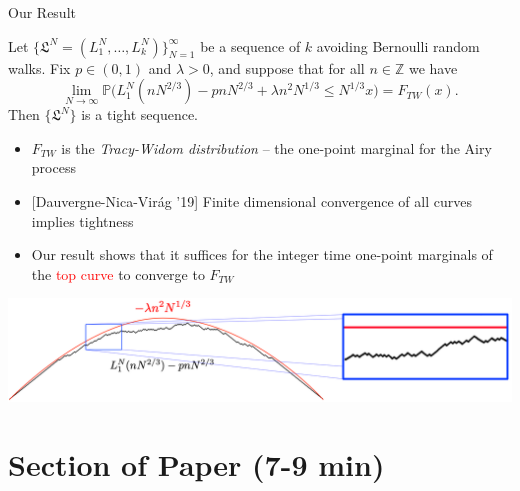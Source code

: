 \documentclass[9pt,t,dvipsnames]{beamer}
\begin{document}
\begin{frame}{Our Result}
\small{\begin{theorem}[DFFSTWZ] Let $\{\mathfrak{L}^N = (L_1^N,\dots,L_k^N)\}_{N=1}^\infty$ be a sequence of $k$ avoiding Bernoulli random walks. Fix $p\in(0,1)$ and $\lambda > 0$, and suppose that for all $n\in\mathbb{Z}$ we have
\[
\lim_{N\to\infty} \mathbb{P}\big(L_1^{N}(nN^{2/3}) - pnN^{2/3} + \lambda n^2 N^{1/3} \leq N^{1/3} x \big) = F_{TW}(x).
\]
Then $\{\mathfrak{L}^N\}$ is a tight sequence.
\end{theorem}}

\begin{itemize}
	\item $F_{TW}$ is the \textit{Tracy-Widom distribution} -- the one-point marginal for the Airy process
	
	\item {[Dauvergne-Nica-Vir\'{a}g '19]} Finite dimensional convergence of all curves implies tightness
	
	\item Our result shows that it suffices for the integer time one-point marginals of the \textcolor{red}{top curve} to converge to $F_{TW}$
\end{itemize}
\begin{center}
	\includegraphics[width=\textwidth]{graphics/ConvToTW.png}
\end{center}
\end{frame}


\section{Section of Paper (7-9 min)}
\end{document}
